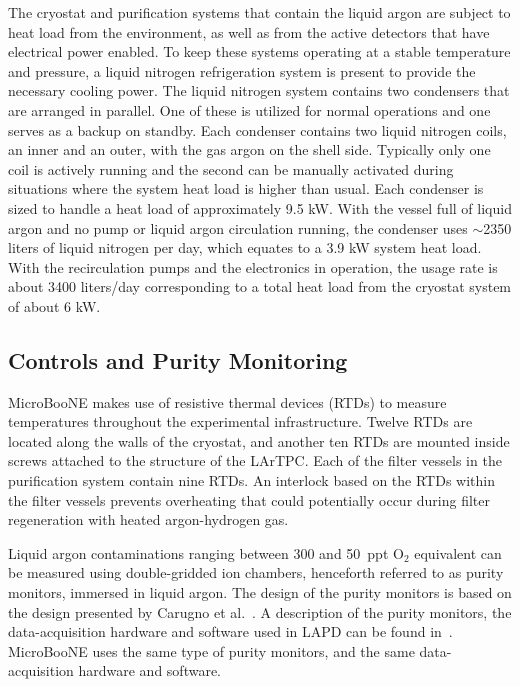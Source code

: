 The cryostat and purification systems that contain the liquid argon are subject to heat load from the environment, as well as from the active detectors that have electrical power enabled.  To keep these systems operating at a stable temperature and pressure, a liquid nitrogen refrigeration system is present to provide the necessary cooling power.  The liquid nitrogen system contains two condensers that are arranged in parallel.  One of these is utilized for normal operations and one serves as a backup on standby.  Each condenser contains two liquid nitrogen coils, an inner and an outer, with the gas argon on the shell side.  Typically only one coil is actively running and the second can be manually activated during situations where the system heat load is higher than usual.  Each condenser is sized to handle a heat load of approximately 9.5 kW.  With the vessel full of liquid argon and no pump or liquid argon circulation running, the condenser uses $\sim$2350 liters of liquid nitrogen per day, which equates to a 3.9 kW system heat load.  With the recirculation pumps and the electronics in operation, the usage rate is about 3400 liters/day corresponding to a total heat load from the cryostat system of about 6 kW.  
%


\subsection{Controls and Purity Monitoring}

MicroBooNE makes use of resistive thermal devices (RTDs) to measure temperatures throughout the experimental infrastructure. Twelve RTDs are located along the walls of the cryostat, and another ten RTDs are mounted inside screws attached to the structure of the LArTPC. Each of the filter vessels in the purification system contain nine RTDs.  An interlock based on the RTDs within the filter vessels prevents overheating that could potentially occur during filter regeneration with heated argon-hydrogen gas.

Liquid argon contaminations ranging between 300 and 50~ppt O$_2$ equivalent can be measured using double-gridded ion chambers, henceforth referred to as purity monitors, immersed in liquid argon. The design of the purity monitors is based on the design presented by Carugno et al.~\cite{Carugno:1990-purityMonitor}.  A description of the purity monitors, the data-acquisition hardware and software used in LAPD can be found in~\cite{Adamowski:2014-LAPD}. MicroBooNE uses the same type of purity monitors, and the same data-acquisition hardware and software. 

